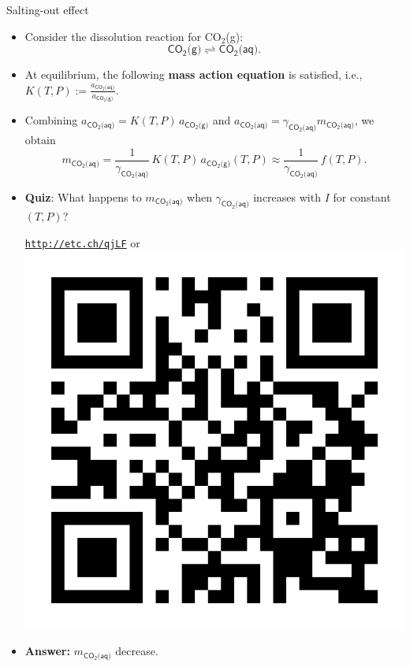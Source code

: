 \begin{frame}[<+->]{Salting-out effect}

\small
\begin{itemize}
\item Consider the dissolution reaction for CO$_{2}$(g):
\[
\mathsf{CO_{2}\text{(g)}}\rightleftharpoons\mathsf{CO_{2}\text{(aq)}}.
\]
\item At equilibrium, the following \textbf{mass action equation} is satisfied, i.e., 
%
$K(T, P) := \frac{a_{\mathsf{CO_{2}\text{(aq)}}}}{a_{\mathsf{CO_{2}\text{(g)}}}}$.
\item Combining $a_{\mathsf{CO_{2}\text{(aq)}}} = K(T, P) \, a_{\mathsf{CO_{2}\text{(g)}}}$ and 
$a_{\mathsf{CO_{2}\text{(aq)}}}=\gamma_{\mathsf{CO_{2}\text{(aq)}}}m_{\mathsf{CO_{2}\text{(aq)}}}$, we obtain 
\[
m_{\mathsf{CO_{2}\text{(aq)}}}=\frac{1}{\gamma_{\mathsf{CO_{2}\text{(aq)}}}} \, K(T, P) \, a_{\mathsf{CO_{2}\text{(g)}}}(T, P)
\approx \frac{1}{\gamma_{\mathsf{CO_{2}\text{(aq)}}}} \, f(T, P).
\]
\item \alert{\textbf{Quiz}}: What happens to $m_{\mathsf{CO_{2}\text{(aq)}}}$ when $\gamma_{\mathsf{CO_{2}\text{(aq)}}}$
increases with $I$ for constant $(T, P)$?
\begin{center}
	\href{http://etc.ch/qjLF}{\textcolor{indigo(dye)}{\tt http://etc.ch/qjLF}} \quad or \quad 
	\includegraphics[height=0.14\columnwidth]{figures/activity-models/poll-ionic-strength.png}
\end{center}
\hiddenpause
\item \textbf{Answer:} $m_{\mathsf{CO_{2}\text{(aq)}}}$ decrease. 
\end{itemize}
\end{frame}
%
%
